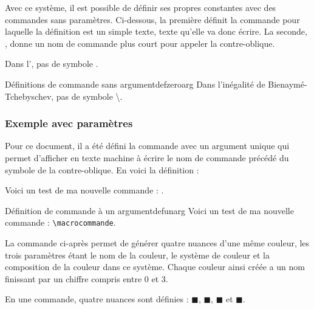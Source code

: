 Avec ce système, il est possible de définir ses propres \og constantes \fg avec des commandes sans paramètres. Ci-dessous, la première définit  la  commande  pour laquelle la définition est un simple texte, texte qu'elle va donc écrire. La seconde, , donne un nom de commande plus court pour appeler la contre-oblique. 

\begin{codedoublevrai}
Dans l'\InBT, pas de symbole \ba.
\end{codedoublevrai}

\begin{codedoublefaux}{Définitions de commande sans argument}{defzeroarg}
\newcommand{\InBT}{inégalité de Bienaymé-Tchebyschev}
\newcommand{\ba}{\textbackslash}
Dans l'\InBT, pas de symbole \ba.
\end{codedoublefaux}

\subsubsection{Exemple avec paramètres}

Pour ce document, il a été défini la commande  avec un argument unique qui permet d'afficher en texte \og machine à écrire \fg le nom de commande précédé du symbole de la contre-oblique. En voici la définition : 

\begin{codedoublevrai}
Voici un test de ma nouvelle commande : .
\end{codedoublevrai}

\begin{codedoublefaux}{Définition de commande à un argument}{defunarg}
\newcommand{\macro}[1]{\texttt{\textbackslash #1}}
Voici un test de ma nouvelle commande : \macro{macrocommande}.
\end{codedoublefaux}

La commande ci-après permet de générer quatre nuances d'une même couleur, les trois paramètres étant le nom de la couleur, le système de couleur et la composition de la couleur dans ce système. Chaque couleur ainsi créée a un nom finissant par un chiffre compris entre 0 et 3.

\begin{codedoublevrai}
En une commande, quatre nuances sont définies : \textcolor{orange30}{$\blacksquare$}, 
\textcolor{orange31}{$\blacksquare$}, \textcolor{orange32}{$\blacksquare$} et
\textcolor{orange33}{$\blacksquare$}.
\end{codedoublevrai}

